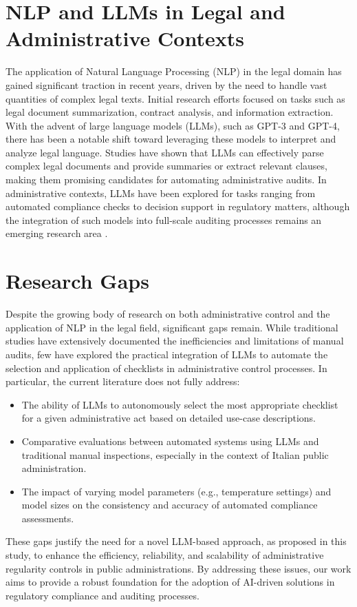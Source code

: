 \documentclass[../main.tex]{subfiles}
\begin{document}
\section*{NLP and LLMs in Legal and Administrative Contexts}
The application of Natural Language Processing (NLP) in the legal domain has gained significant traction in recent years, driven by the need to handle vast quantities of complex legal texts. Initial research efforts focused on tasks such as legal document summarization, contract analysis, and information extraction\cite{katz_natural_2023}. With the advent of large language models (LLMs), such as GPT-3 and GPT-4, there has been a notable shift toward leveraging these models to interpret and analyze legal language. Studies have shown that LLMs can effectively parse complex legal documents and provide summaries or extract relevant clauses, making them promising candidates for automating administrative audits\cite{ariai_natural_2025}. In administrative contexts, LLMs have been explored for tasks ranging from automated compliance checks to decision support in regulatory matters, although the integration of such models into full-scale auditing processes remains an emerging research area .

\section*{Research Gaps}
Despite the growing body of research on both administrative control and the application of NLP in the legal field, significant gaps remain. While traditional studies have extensively documented the inefficiencies and limitations of manual audits, few have explored the practical integration of LLMs to automate the selection and application of checklists in administrative control processes. In particular, the current literature does not fully address:
\begin{itemize}
    \item The ability of LLMs to autonomously select the most appropriate checklist for a given administrative act based on detailed use-case descriptions.
    \item Comparative evaluations between automated systems using LLMs and traditional manual inspections, especially in the context of Italian public administration.
    \item The impact of varying model parameters (e.g., temperature settings) and model sizes on the consistency and accuracy of automated compliance assessments.
\end{itemize}
These gaps justify the need for a novel LLM-based approach, as proposed in this study, to enhance the efficiency, reliability, and scalability of administrative regularity controls in public administrations. By addressing these issues, our work aims to provide a robust foundation for the adoption of AI-driven solutions in regulatory compliance and auditing processes.
\end{document}
